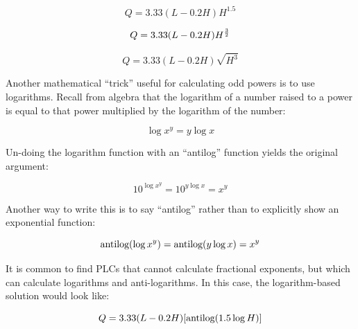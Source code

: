 $$Q = 3.33 (L - 0.2H) H^{1.5}$$

$$Q = 3.33 (L - 0.2H) H^{3 \over 2}$$

$$Q = 3.33 (L - 0.2H) \sqrt{H^{3}}$$

Another mathematical ``trick'' useful for calculating odd powers is to use logarithms.  Recall from algebra that the logarithm of a number raised to a power is equal to that power multiplied by the logarithm of the number:

$$\log x^y = y \log x$$

Un-doing the logarithm function with an ``antilog'' function yields the original argument:

$$10^{\log x^y} = 10^{y \log x} = x^y$$

Another way to write this is to say ``antilog'' rather than to explicitly show an exponential function:

$$\hbox{antilog}(\log x^y) = \hbox{antilog}(y \log x) = x^y$$

It is common to find PLCs that cannot calculate fractional exponents, but which can calculate logarithms and anti-logarithms.  In this case, the logarithm-based solution would look like:

$$Q = 3.33 (L - 0.2H) [\hbox{antilog}(1.5 \log H)]$$



